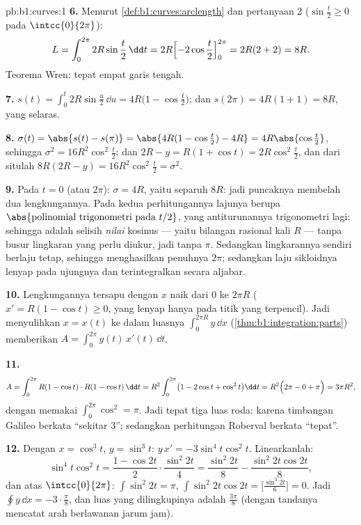 \begin{solution}{pb:b1:curves:1}
\textbf{6.} Menurut \cref{def:b1:curves:arclength} dan pertanyaan 2
($\sin\frac t2 \geq 0$ pada $\intcc{0}{2\pi}$):
\[
L = \int_0^{2\pi} 2R\sin\frac t2\,\dd t
= 2R\Bigl[-2\cos\frac t2\Bigr]_0^{2\pi} = 2R(2 + 2) = 8R .
\]
Teorema Wren: tepat empat garis tengah.

\textbf{7.} $s(t) = \int_0^t 2R\sin\frac u2\,\dd u =
4R\bigl(1 - \cos\frac t2\bigr)$; dan $s(2\pi) = 4R(1+1) = 8R$,
yang selaras.

\textbf{8.} $\sigma(t) = \abs{s(t) - s(\pi)} = \abs{4R(1 -
\cos\frac t2) - 4R} = 4R\abs{\cos\frac t2}$, sehingga $\sigma^2 =
16R^2\cos^2\frac t2$; dan $2R - y = R(1 + \cos t) =
2R\cos^2\frac t2$, dan dari situlah $8R(2R - y) = 16R^2\cos^2\frac t2 =
\sigma^2$.

\textbf{9.} Pada  $t = 0$ (atau $2\pi$): $\sigma = 4R$, yaitu separuh
$8R$: jadi puncaknya membelah dua lengkungannya. Pada kedua perhitungannya
lajunya berupa $\abs{\text{polinomial trigonometri pada } t/2}$, yang
antiturunannya trigonometri lagi: sehingga  adalah
selisih \emph{nilai} kosinus --- yaitu bilangan rasional
kali $R$ --- tanpa busur lingkaran yang perlu diukur, jadi tanpa $\pi$.
Sedangkan lingkarannya sendiri berlaju tetap, sehingga  
menghasilkan   penuhnya $2\pi$; sedangkan laju sikloidnya
lenyap pada ujungnya dan terintegralkan secara aljabar.

\textbf{10.} Lengkungannya tersapu dengan $x$ naik dari $0$ ke
$2\pi R$ ($x' = R(1 - \cos t) \geq 0$, yang lenyap hanya pada
titik yang terpencil). Jadi menyulihkan $x = x(t)$ ke dalam  luasnya
$\int_0^{2\pi R} y\,\dd x$ (\cref{thm:b1:integration:parts})
memberikan $A = \int_0^{2\pi} y(t)\,x'(t)\,\dd t$.

\textbf{11.}
\[
A = \int_0^{2\pi} R(1 - \cos t)\cdot R(1 - \cos t)\,\dd t
= R^2\int_0^{2\pi}\bigl(1 - 2\cos t + \cos^2 t\bigr)\dd t
= R^2\Bigl(2\pi - 0 + \pi\Bigr) = 3\pi R^2 ,
\]
dengan memakai $\int_0^{2\pi}\cos^2 = \pi$. Jadi tepat tiga luas roda:
karena timbangan Galileo berkata ``sekitar $3$''; sedangkan perhitungan Roberval
berkata ``tepat''.

\textbf{12.} Dengan $x = \cos^3 t$, $y = \sin^3 t$: $y\,x' =
-3\sin^4 t\cos^2 t$. Linearkanlah:
\[
\sin^4 t\cos^2 t = \frac{1 - \cos 2t}{2}\cdot\frac{\sin^2
2t}{4} = \frac{\sin^2 2t}{8} - \frac{\sin^2 2t\cos 2t}{8} ,
\]
dan atas $\intcc{0}{2\pi}$: $\int\sin^2 2t = \pi$, $\int \sin^2
2t\cos 2t = \bigl[\frac{\sin^3 2t}{6}\bigr] = 0$. Jadi $\oint
y\,\dd x = -3\cdot\frac\pi8$, dan luas yang dilingkupinya adalah
$\frac{3\pi}8$ (dengan tandanya mencatat arah berlawanan
jarum jam).


\end{solution}
